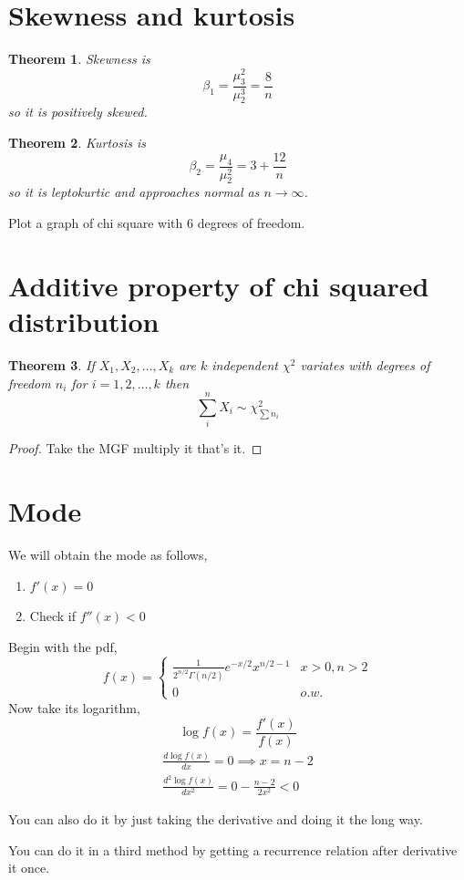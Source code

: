 \documentclass[oneside,11pt,pdftex]{book}%
\numberwithin{equation}{section}
\newtheorem{theorem}{Theorem}[chapter]%
\numberwithin{section}{chapter}
\numberwithin{equation}{chapter}
\begin{document}
\section{Skewness and kurtosis}
\begin{theorem}
	Skewness is \[ \beta_1=\frac{\mu_3^2}{\mu_2^3}=\frac{8}{n} \] so it is positively skewed.
\end{theorem}
\begin{theorem}
	Kurtosis is \[ \beta_2=\frac{\mu_4}{\mu_2^2}= 3+\frac{12}{n}\] so it is leptokurtic and approaches normal as $ n \rightarrow \infty $.
\end{theorem}
Plot a graph of chi square with 6 degrees of freedom.
\section{Additive property of chi squared distribution}
\begin{theorem}
	If $ X_1, X_2, \dots, X_k $ are $ k $ independent $ \chi^2 $ variates with degrees of freedom $ n_i $ for $ i=1,2,\dots,k $ then $$ \sum_i^n X_i \sim \chi^2_{\sum n_i}$$
\end{theorem}
\begin{proof}
	Take the MGF multiply it that's it.
\end{proof}

\section{Mode}
We will obtain the mode as follows,
\begin{enumerate}
	\item $ f'(x) =0$
	\item Check if $ f''(x)<0 $
\end{enumerate}

Begin with the pdf,
\[ f(x)=\begin{cases}
	\frac{1}{2^{n/2}\Gamma(n/2)}e^{-x/2}x^{n/2-1} & x>0, n>2\\
	0 & o.w.
\end{cases} \]
Now take its logarithm,
\[ \log f(x) = \frac{f'(x)}{f(x)}\]
\begin{align*}
	\frac{d \log f(x)}{dx}=0\implies x=n-2\\
	\frac{d^2 \log f(x)}{dx^2}=0-\frac{n-2}{2x^2}<0
\end{align*}

You can also do it by just taking the derivative and doing it the long way.

You can do it in a third method by getting a recurrence relation after derivative it once.
\end{document}
